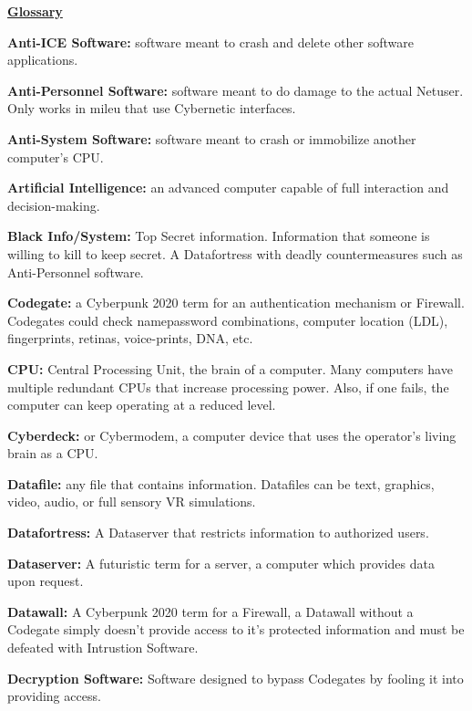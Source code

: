 \documentclass[11pt,twoside,a4paper]{article}
\newenvironment{local_itemize}{
\begin{itemize}
     \setlength{\itemsep}{1pt}
     \setlength{\parskip}{0pt}
     \setlength{\parsep}{0pt}}
{\end{itemize}
}
\begin{document}
\begin{multicols*}{2}
	\small
\textbf{\underline{\large Glossary}} %

\begin{local_itemize}
	\item[] \textbf{Anti-ICE Software: } software meant to crash and delete other software applications.
	\item[] \textbf{Anti-Personnel Software: } software meant to do damage to the actual Netuser. Only works in mileu that use Cybernetic interfaces.
	\item[] \textbf{Anti-System Software: } software meant to crash or immobilize another computer's CPU.
	\item[] \textbf{Artificial Intelligence: } an advanced computer capable of full interaction and decision-making.
	\item[] \textbf{Black Info/System: } Top Secret information. Information that someone is willing to kill to keep secret. A Datafortress with deadly countermeasures such as Anti-Personnel software.
	\item[] \textbf{Codegate: } a Cyberpunk 2020 term for an authentication mechanism or Firewall. Codegates could check namepassword combinations, computer location (LDL), fingerprints, retinas, voice-prints, DNA, etc.
	\item[] \textbf{CPU: } Central Processing Unit, the brain of a computer. Many computers have multiple redundant CPUs that increase processing power. Also, if one fails, the computer can keep operating at a reduced level.
	\item[] \textbf{Cyberdeck: } or Cybermodem, a computer device that uses the operator's living brain as a CPU.
	\item[] \textbf{Datafile: } any file that contains information. Datafiles can be text, graphics, video, audio, or full sensory VR simulations.
	\item[] \textbf{Datafortress: } A Dataserver that restricts information to authorized users.
	\item[] \textbf{Dataserver: } A futuristic term for a server, a computer which provides data upon request.
	\item[] \textbf{Datawall: } A Cyberpunk 2020 term for a Firewall, a Datawall without a Codegate simply doesn't provide access to it's protected information and must be defeated with Intrustion Software.
	\item[] \textbf{Decryption Software: } Software designed to bypass Codegates by fooling it into providing access.

\end{local_itemize}
\end{multicols*}
\end{document}
